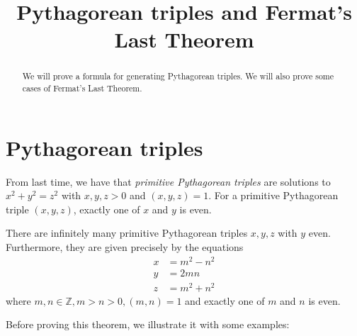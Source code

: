 \documentclass{ximera}
\title{Pythagorean triples and Fermat's Last Theorem}
\begin{document}
  
\begin{abstract}  
We will prove a formula for generating Pythagorean triples. We will also prove some cases of Fermat's Last Theorem.\end{abstract}  
\maketitle  
\section*{Pythagorean triples}

From last time, we have that \emph{primitive Pythagorean triples} are solutions to $x^2+y^2=z^2$ with $x,y,z>0$ and $(x,y,z)=1$. For a primitive Pythagorean triple $(x,y,z)$, exactly one of $x$ and $y$ is even.

\begin{theorem}
 There are infinitely many primitive Pythagorean triples $x,y,z$ with $y$ even. Furthermore, they are given precisely by the equations 
\begin{align*}
 x&=m^2-n^2\\
 y&=2mn\\
 z&=m^2+n^2
\end{align*}
where $m,n\in\mathbb{Z}, m>n>0, (m,n)=1$ and exactly one of $m$ and $n$ is even.
\end{theorem}

Before proving this theorem, we illustrate it with some examples:
\end{document}
